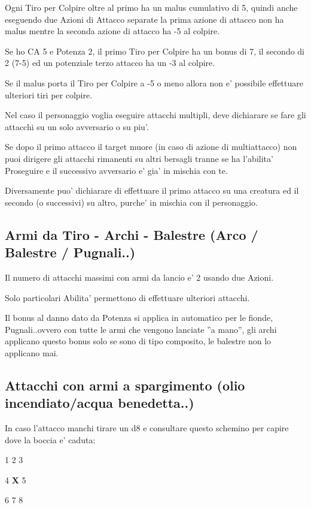 \documentclass[a4paper,11pt,twoside,openany]{book}
\begin{document}
Ogni Tiro per Colpire oltre al primo ha un malus cumulativo di 5, quindi anche eseguendo due Azioni di Attacco separate la prima azione di attacco non ha malus mentre la seconda azione di attacco ha -5 al colpire.

Se ho CA 5 e Potenza 2, il primo Tiro per Colpire ha un bonus di 7, il secondo di 2 (7-5) ed un potenziale terzo attacco ha un -3 al colpire.

Se il malus porta il Tiro per Colpire a -5 o meno allora non e' possibile effettuare ulteriori tiri per colpire.

Nel caso il personaggio voglia eseguire attacchi multipli, deve dichiarare se fare gli attacchi su un solo avversario o su piu'.

Se dopo il primo attacco il target muore (in caso di azione di multiattacco) non puoi dirigere gli attacchi rimanenti su altri bersagli tranne se ha l'abilita' Proseguire e il successivo avversario e' gia' in mischia con te.

Diversamente puo' dichiarare di effettuare il primo attacco su una creatura ed il secondo (o successivi) su altro, purche' in mischia con il personaggio.

\subsection{Armi da Tiro - Archi - Balestre (Arco / Balestre / Pugnali..)}

Il numero di attacchi massimi con armi da lancio e' 2 usando due Azioni.

Solo particolari Abilita' permettono di effettuare ulteriori attacchi.

Il bonus al danno dato da Potenza si applica in automatico per le fionde, Pugnali..ovvero con tutte le armi che vengono lanciate ''a mano'', gli archi applicano questo bonus solo se sono di tipo composito, le balestre non lo applicano mai.

\subsection{Attacchi con armi a spargimento (olio incendiato/acqua benedetta..)}

In caso l'attacco manchi tirare un d8 e consultare questo schemino per capire dove la boccia e' caduta:

1 2 3

4 \textbf{X} 5

6 7 8
\end{document}
